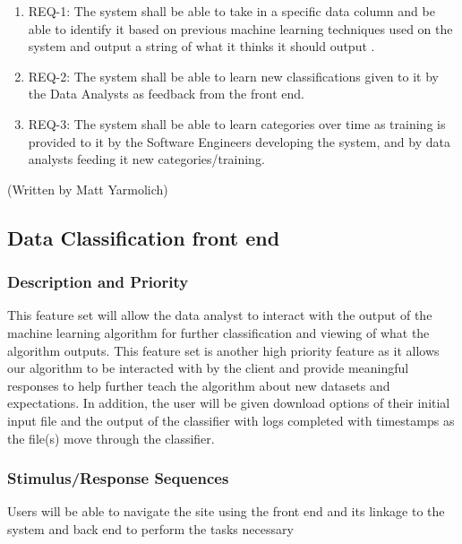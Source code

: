 \documentclass[12pt,oneside,letterpaper]{article}
\begin{document}
\begin{enumerate}
\item REQ-1: The system shall be able to take in a specific data column and be able to identify it based on previous machine learning techniques used on the system and output a string of what it thinks it should output .
\item REQ-2: The system shall be able to learn new classifications given to it by the Data Analysts as feedback from the \gls{front end}.
\item REQ-3: The system shall be able to learn categories over time as training is provided to it by the Software Engineers developing the system, and by data analysts feeding it new categories/training.
\end{enumerate} (Written by Matt Yarmolich)

\subsection{Data Classification \gls{front end}}
\subsubsection{Description and Priority}
This feature set will allow the data analyst to interact with the output of the machine learning algorithm for further classification and viewing of what the algorithm outputs. This feature set is another high priority feature as it allows our algorithm to be interacted with by the client and provide meaningful responses to help further teach the algorithm about new datasets and expectations. In addition, the user will be given download options of their initial input file and the output of the classifier with logs completed with timestamps as the file(s) move through the classifier.
\subsubsection{Stimulus/Response Sequences}
Users will be able to navigate the site using the \gls{front end} and its linkage to the system and \gls{back end} to perform the tasks necessary
\end{document}
